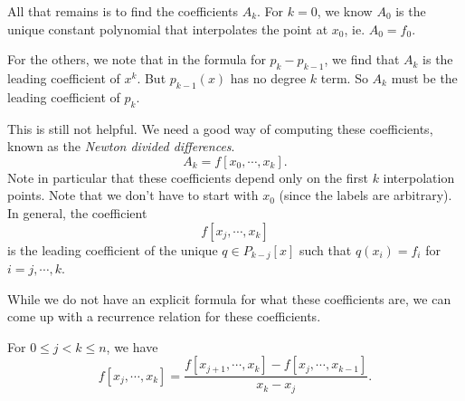 \documentclass[a4paper]{article}
\begin{document}
All that remains is to find the coefficients $A_k$. For $k = 0$, we know $A_0$ is the unique constant polynomial that interpolates the point at $x_0$, ie. $A_0 = f_0$.

For the others, we note that in the formula for $p_k - p_{k - 1}$, we find that $A_k$ is the leading coefficient of $x^k$. But $p_{k - 1}(x)$ has no degree $k$ term. So $A_k$ must be the leading coefficient of $p_k$.

This is still not helpful. We need a good way of computing these coefficients, known as the \emph{Newton divided differences}.
\[
  A_k = f[x_0, \cdots, x_k].
\]
Note in particular that these coefficients depend only on the first $k$ interpolation points. Note that we don't have to start with $x_0$ (since the labels are arbitrary). In general, the coefficient
\[
  f[x_j, \cdots, x_k]
\]
is the leading coefficient of the unique $q \in P_{k - j}[x]$ such that $q(x_i) = f_i$ for $i = j, \cdots, k$.

While we do not have an explicit formula for what these coefficients are, we can come up with a recurrence relation for these coefficients.

\begin{thm}
  For $0 \leq j < k \leq n$, we have
  \[
    f[x_j, \cdots, x_k] = \frac{f[x_{j + 1}, \cdots, x_k] - f[x_j, \cdots, x_{k - 1}]}{x_k - x_j}.
  \]
\end{thm}
\end{document}
